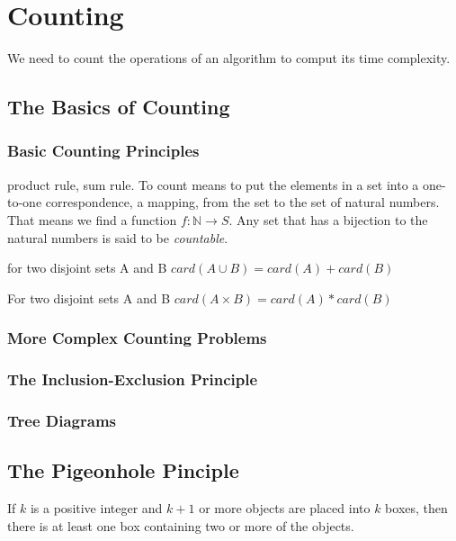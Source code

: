 







\chapter {Counting}
We need to count the operations of an algorithm to comput its time complexity.

\section {The Basics of Counting}
    \subsection {Basic Counting Principles}
product rule, sum rule.
To count means to put the elements in a set into a one-to-one correspondence, a mapping, from the set to the set of natural numbers. That means we find a function $f:\mathbb{N} \rightarrow S$. 
Any set that has a bijection to the natural numbers is said to be \textit{countable}. 


\begin{theorem}
 for two disjoint sets A and B
$card(A \cup B) = card(A) + card(B)$
\end {theorem}


\begin{theorem}
For two disjoint sets A and B
$card(A \times B) = card(A) * card(B)$
\end{theorem}

    \subsection {More Complex Counting Problems}
    \subsection {The Inclusion-Exclusion Principle}
    \subsection {Tree Diagrams}

\section {The Pigeonhole Pinciple}
\begin{theorem}
If $k$ is a positive integer and $k+1$ or more objects are placed into $k$ boxes, then there is at least one box containing two or more of the objects.
\end{theorem}

